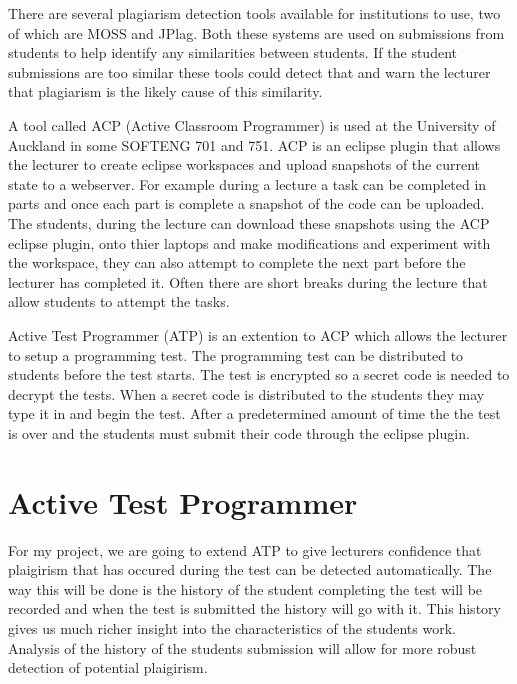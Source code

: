 \documentclass[twocolumn]{article}
\begin{document}
There are several plagiarism detection tools available for institutions to use,
two of which are MOSS\cite{schleimer2003winnowing} and
JPlag\cite{lutz2000jplag}. Both these systems are used on submissions from
students to help identify any similarities between students. If the student
submissions are too similar these tools could detect that and warn the lecturer
that plagiarism is the likely cause of this similarity.

A tool called ACP (Active Classroom Programmer)\cite{giacaman2015active} is used
at the University of Auckland in some SOFTENG 701 and 751. ACP is an eclipse
plugin that allows the lecturer to create eclipse workspaces and upload
snapshots of the current state to a webserver. For example during a lecture a
task can be completed in parts and once each part is complete a snapshot of the
code can be uploaded. The students, during the lecture can download these
snapshots using the ACP eclipse plugin, onto thier laptops and make
modifications and experiment with the workspace, they can also attempt to
complete the next part before the lecturer has completed it. Often there are
short breaks during the lecture that allow students to attempt the tasks.

Active Test Programmer (ATP) is an extention to ACP which allows the lecturer to
setup a programming test. The programming test can be distributed to students
before the test starts. The test is encrypted so a secret code is needed to
decrypt the tests. When a secret code is distributed to the students they may
type it in and begin the test. After a predetermined amount of time the the test
is over and the students must submit their code through the eclipse plugin.

\section{Active Test Programmer}
For my project, we are going to extend ATP to give lecturers confidence that
plaigirism that has occured during the test can be detected automatically. The
way this will be done is the history of the student completing the test will be
recorded and when the test is submitted the history will go with it. This
history gives us much richer insight into the characteristics of the students
work. Analysis of the history of the students submission will allow for more
robust detection of potential plaigirism.
\end{document}
